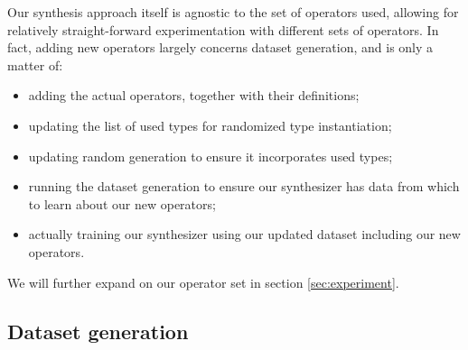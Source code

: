\documentclass{article}
\begin{document}
Our synthesis approach itself is agnostic to the set of operators used,
allowing for relatively straight-forward experimentation with different sets of operators.
In fact, adding new operators largely concerns dataset generation, and is only a matter of:
\begin{itemize}
    \item adding the actual operators, together with their definitions;
    \item updating the list of used types for randomized type instantiation;
    \item updating random generation to ensure it incorporates used types;
    \item running the dataset generation to ensure our synthesizer has data from which to learn about our new operators;
    \item actually training our synthesizer using our updated dataset including our new operators.
\end{itemize}


We will further expand on our operator set
in section \ref{sec:experiment}.

\subsection{Dataset generation} \label{sec:datagen}

\end{document}
